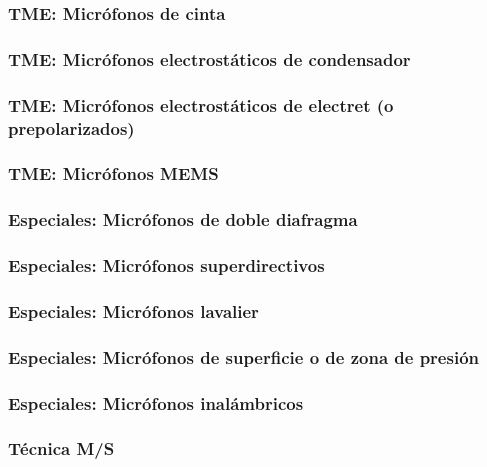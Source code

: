 \documentclass[a4paper, 8pt]{extarticle}
\begin{document}
\begin{multicols}{3}
  \subsubsection{TME: Micrófonos de cinta}
  \subsubsection{TME: Micrófonos electrostáticos de condensador}
  \subsubsection{TME: Micrófonos electrostáticos de electret (o prepolarizados)}
  \subsubsection{TME: Micrófonos MEMS}
  \subsubsection{Especiales: Micrófonos de doble diafragma}
  \subsubsection{Especiales: Micrófonos superdirectivos}
  \subsubsection{Especiales: Micrófonos lavalier}
  \subsubsection{Especiales: Micrófonos de superficie o de zona de presión}
  \subsubsection{Especiales: Micrófonos inalámbricos}
  \subsubsection{Técnica M/S}


\end{multicols}
\end{document}
